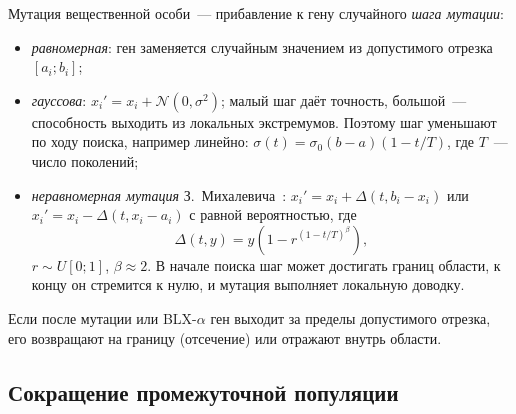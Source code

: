 Мутация вещественной особи~--- прибавление к гену случайного \emph{шага мутации}:
\begin{itemize}
\item \emph{равномерная}: ген заменяется случайным значением из допустимого отрезка $[a_i; b_i]$;
\item \emph{гауссова}: $x_i' = x_i + \mathcal{N}(0, \sigma^2)$; малый шаг даёт точность, большой~---
способность выходить из локальных экстремумов. Поэтому шаг уменьшают по ходу поиска, например
линейно: $\sigma(t) = \sigma_0(b - a)(1 - t/T)$, где $T$~--- число поколений;
\item \emph{неравномерная мутация} З.~Михалевича~\cite{michalewicz1996}: $x_i' = x_i + \Delta(t, b_i - x_i)$
или $x_i' = x_i - \Delta(t, x_i - a_i)$ с равной вероятностью, где
\begin{equation}
\label{eq:nonuniform}
\Delta(t, y) = y\left(1 - r^{(1 - t/T)^{\beta}}\right),
\end{equation}
$r \sim U[0; 1]$, $\beta \approx 2$. В начале поиска шаг может достигать границ области, к концу он
стремится к нулю, и мутация выполняет локальную доводку.
\end{itemize}
Если после мутации или BLX-$\alpha$ ген выходит за пределы допустимого отрезка, его возвращают на
границу (отсечение) или отражают внутрь области.

\subsection{Сокращение промежуточной популяции}

